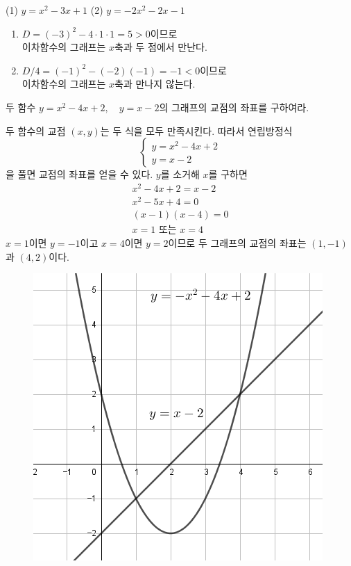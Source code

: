 \documentclass{oblivoir}
\begin{document}
%
(1) \(y=x^2-3x+1\)
(2) \(y=-2x^2-2x-1\)
\begin{mdframed}
\begin{enumerate}
\item
\(D=(-3)^2-4\cdot1\cdot1=5>0\)이므로\\
이차함수의 그래프는 \(x\)축과 두 점에서 만난다.
\item
\(D/4=(-1)^2-(-2)(-1)=-1<0\)이므로\\
이차함수의 그래프는 \(x\)축과 만나지 않는다.
\end{enumerate}
\end{mdframed}

\clearpage
%
\exam{}
두 함수 \(y=x^2-4x+2,\quad y=x-2\)의 그래프의 교점의 좌표를 구하여라.
\begin{mdframed}
두 함수의 교점 \((x,y)\)는 두 식을 모두 만족시킨다.
따라서 연립방정식
\[\begin{cases}y=x^2-4x+2\\y=x-2\end{cases}\]
을 풀면 교점의 좌표를 얻을 수 있다.
\(y\)를 소거해 \(x\)를 구하면
\begin{gather*}
x^2-4x+2=x-2\\
x^2-5x+4=0\\
(x-1)(x-4)=0\\
x=1\text{ 또는 }x=4
\end{gather*}
\(x=1\)이면 \(y=-1\)이고 \(x=4\)이면 \(y=2\)이므로
두 그래프의 교점의 좌표는 \((1,-1)\)과 \((4,2)\)이다.
\end{mdframed}
\begin{figure}[h!]
\centering
\includegraphics[height=0.3\textheight]{intersects}
\end{figure}
\end{document}
